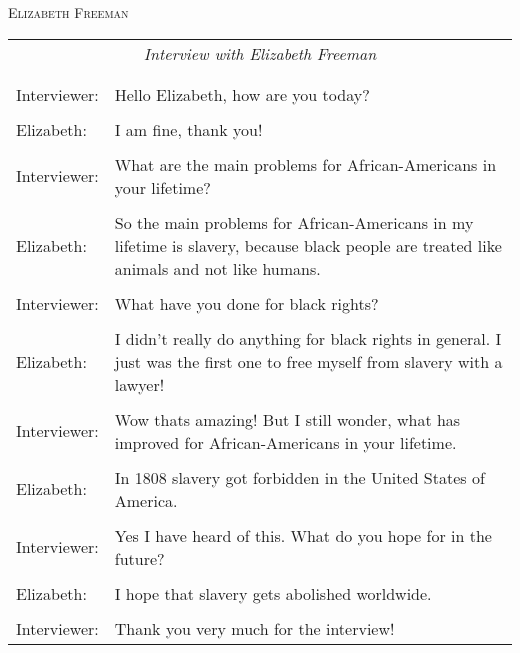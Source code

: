 \documentclass[11pt,a4paper]{article}
\begin{document}
	\textsc{Elizabeth Freeman}
	\begin{longtable}[c]{p{3cm}p{9cm}}\\
		\multicolumn{2}{c}{\textsl{Interview with Elizabeth Freeman}} \\\\\\
		Interviewer: & Hello Elizabeth, how are you today? \\\\
		Elizabeth: & I am fine, thank you!\\\\
		Interviewer: & What are the main problems for African-Americans in your lifetime?\\\\
		Elizabeth: & So the main problems for African-Americans in my lifetime is slavery, because black people are treated like animals and not like humans. \\\\
		Interviewer: & What have you done for black rights? \\\\
		Elizabeth: & I didn't really do anything for black rights in general. I just was the first one to free myself from slavery with a lawyer! \\\\			
		Interviewer: & Wow thats amazing! But I still wonder, what has improved for African-Americans in your lifetime. \\\\
		Elizabeth: & In 1808 slavery got forbidden in the United States of America. \\\\
		Interviewer: & Yes I have heard of this. What do you hope for in the future? \\\\
		Elizabeth: & I hope that slavery gets abolished worldwide. \\\\
		Interviewer: & Thank you very much for the interview! 
	\end{longtable}
\end{document}
